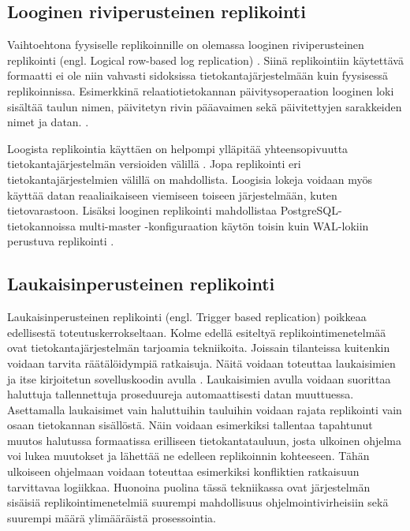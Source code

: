 \documentclass[finnish,twoside,censored,csm,sw-track-2018]{HYthesisML}
\begin{document}
\subsection{Looginen riviperusteinen replikointi}

Vaihtoehtona fyysiselle replikoinnille on olemassa looginen riviperusteinen replikointi (engl. Logical row-based log replication) \citep{Kleppmann}. Siinä replikointiin käytettävä formaatti ei ole niin vahvasti sidoksissa tietokantajärjestelmään kuin fyysisessä replikoinnissa. Esimerkkinä relaatiotietokannan päivitysoperaation looginen loki sisältää taulun nimen, päivitetyn rivin pääavaimen sekä päivitettyjen sarakkeiden nimet ja datan. \citep{postgres-replication-solutions}.

Loogista replikointia käyttäen on helpompi ylläpitää yhteensopivuutta tietokantajärjestelmän versioiden välillä \citep{Kleppmann}. Jopa replikointi eri tietokantajärjestelmien välillä on mahdollista. Loogisia lokeja voidaan myös käyttää datan reaaliaikaiseen viemiseen toiseen järjestelmään, kuten tietovarastoon. Lisäksi looginen replikointi mahdollistaa PostgreSQL-tietokannoissa multi-master -konfiguraation käytön toisin kuin WAL-lokiin perustuva replikointi \citep{postgres-replication-solutions}.

\subsection{Laukaisinperusteinen replikointi}

Laukaisinperusteinen replikointi (engl. Trigger based replication) poikkeaa edellisestä toteutuskerrokseltaan. Kolme edellä esiteltyä replikointimenetelmää ovat tietokantajärjestelmän tarjoamia tekniikoita. Joissain tilanteissa kuitenkin voidaan tarvita räätälöidympiä ratkaisuja. Näitä voidaan toteuttaa laukaisimien ja itse kirjoitetun sovelluskoodin avulla \citep{Kleppmann}. Laukaisimien avulla voidaan suorittaa haluttuja tallennettuja proseduureja automaattisesti datan muuttuessa. Asettamalla laukaisimet vain haluttuihin tauluihin voidaan rajata replikointi vain osaan tietokannan sisällöstä. Näin voidaan esimerkiksi tallentaa tapahtunut muutos halutussa formaatissa erilliseen tietokantatauluun, josta ulkoinen ohjelma voi lukea muutokset ja lähettää ne edelleen replikoinnin kohteeseen. Tähän ulkoiseen ohjelmaan voidaan toteuttaa esimerkiksi konfliktien ratkaisuun tarvittavaa logiikkaa. Huonoina puolina tässä tekniikassa ovat järjestelmän sisäisiä replikointimenetelmiä suurempi mahdollisuus ohjelmointivirheisiin sekä suurempi määrä ylimääräistä prosessointia.
\end{document}
